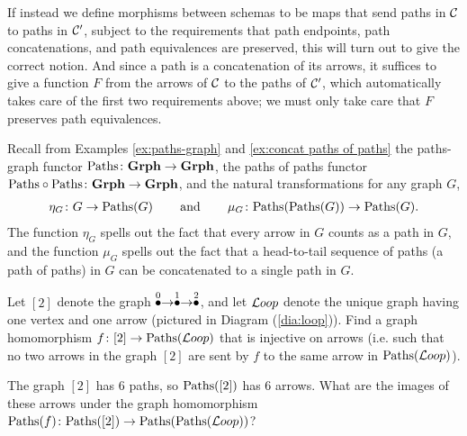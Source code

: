 \documentclass[CT4S-EN-RU]{subfiles}
\begin{document}
\begin{blockRUS}
\end{blockRUS}

\begin{blockENG}
If instead we define morphisms between schemas to be maps that send paths in $\mathcal{C}$ to paths in $\mathcal{C}'$, subject to the requirements that path endpoints, path concatenations, and path equivalences are preserved, this will turn out to give the correct notion. And since a path is a concatenation of its arrows, it suffices to give a function $F$ from the arrows of $\mathcal{C}$ to the paths of $\mathcal{C}'$, which automatically takes care of the first two requirements above; we must only take care that $F$ preserves path equivalences.
\end{blockENG}

\begin{blockRUS}
\end{blockRUS}

\begin{blockENG}
Recall from Examples \ref{ex:paths-graph} and \ref{ex:concat paths of paths} the paths-graph functor $\textnormal{Paths}\colon{\mathbf{Grph}}\rightarrow{\mathbf{Grph}}$, the paths of paths functor $\textnormal{Paths}\circ\textnormal{Paths}\colon{\mathbf{Grph}}\rightarrow{\mathbf{Grph}}$, and the natural transformations for any graph $G$, 
\begin{align}\label{dia:proto paths monad}
\eta_G\colon G\rightarrow\textnormal{Paths}(G)\hspace{.3in}\textnormal{and}\hspace{.3in}\mu_G\colon\textnormal{Paths}(\textnormal{Paths}(G))\rightarrow\textnormal{Paths}(G).
\end{align}
The function $\eta_G$ spells out the fact that every arrow in $G$ counts as a path in $G$, and the function $\mu_G$ spells out the fact that a head-to-tail sequence of paths (a path of paths) in $G$ can be concatenated to a single path in $G$.
\end{blockENG}

\begin{blockRUS}
\end{blockRUS}

\begin{exerciseENG}
Let $[2]$ denote the graph $\stackrel{0}{\bullet}\rightarrow\stackrel{1}{\bullet}\rightarrow\stackrel{2}{\bullet}$, and let ${\mathcal{L} oop}$ denote the unique graph having one vertex and one arrow (pictured in Diagram (\ref{dia:loop})).
\sexc Find a graph homomorphism $f\colon[2]\rightarrow\textnormal{Paths}({\mathcal{L} oop})$ that is injective on arrows (i.e. such that no two arrows in the graph $[2]$ are sent by $f$ to the same arrow in $\textnormal{Paths}({\mathcal{L} oop})$).
\item The graph $[2]$ has 6 paths, so $\textnormal{Paths}([2])$ has 6 arrows. What are the images of these arrows under the graph homomorphism $\textnormal{Paths}(f)\colon\textnormal{Paths}([2])\rightarrow\textnormal{Paths}(\textnormal{Paths}({\mathcal{L} oop}))$? 
\endsexc
\end{exerciseENG}
\end{document}
